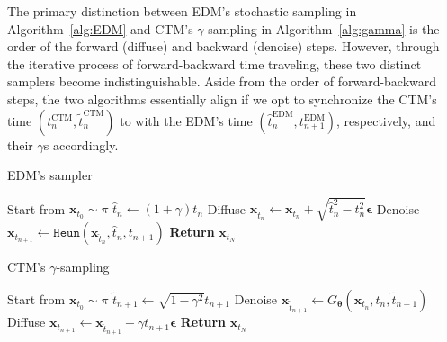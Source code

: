 \documentclass{article} \usepackage{iclr2024_coNFErence,times}
\theoremstyle{definition}
\theoremstyle{remark}
\begin{document}
The primary distinction between EDM's stochastic sampling in Algorithm~\ref{alg:EDM} and CTM's $\gamma$-sampling in Algorithm~\ref{alg:gamma} is the order of the forward (diffuse) and backward (denoise) steps. However, through the iterative process of forward-backward time traveling, these two distinct samplers become indistinguishable. Aside from the order of forward-backward steps, the two algorithms essentially align if we opt to synchronize the CTM's time $(t_{n}^{\text{CTM}},\tilde{t}_{n}^{\text{CTM}})$ to with the EDM's time $(\hat{t}_{n}^{\text{EDM}},t_{n+1}^{\text{EDM}})$, respectively, and their $\gamma$s accordingly. 

\begin{minipage}{0.48\textwidth}
\begin{algorithm}[H]
    \centering
    \caption{EDM's sampler}\label{alg:EDM}
    \begin{algorithmic}[1]
    \State Start from $\mathbf{x}_{t_{0}}\sim\pi$
        \State $\hat{t}_{n}\leftarrow (1+\gamma)t_{n}$
        \State Diffuse $\mathbf{x}_{\hat{t}_{n}}\leftarrow\mathbf{x}_{t_{n}}+\sqrt{\hat{t}_{n}^{2}-t_{n}^{2}}\bm{\epsilon}$
        \State Denoise $\mathbf{x}_{t_{n+1}}\leftarrow\texttt{Heun}(\mathbf{x}_{\hat{t}_{n}},\hat{t}_{n},t_{n+1})$
        \EndFor
        \State \textbf{Return}  $\mathbf{x}_{t_{N}}$
    \end{algorithmic}
\end{algorithm}
\end{minipage}
\hfill
\begin{minipage}{0.48\textwidth}
\begin{algorithm}[H]
    \centering
    \caption{CTM's $\gamma$-sampling}\label{alg:gamma}
    \begin{algorithmic}[1]
    \State Start from $\mathbf{x}_{t_{0}}\sim\pi$
        \State $\tilde{t}_{n+1}\leftarrow \sqrt{1-\gamma^{2}}t_{n+1}$
        \State Denoise $\mathbf{x}_{\tilde{t}_{n+1}}\leftarrow G_{\bm{\theta}}(\mathbf{x}_{t_{n}},t_{n},\tilde{t}_{n+1})$
        \State Diffuse $\mathbf{x}_{t_{n+1}}\leftarrow\mathbf{x}_{\hat{t}_{n+1}}+\gamma t_{n+1}\bm{\epsilon}$
        \EndFor
        \State \textbf{Return}  $\mathbf{x}_{t_{N}}$
    \end{algorithmic}
\end{algorithm}
\end{minipage}
\end{document}
